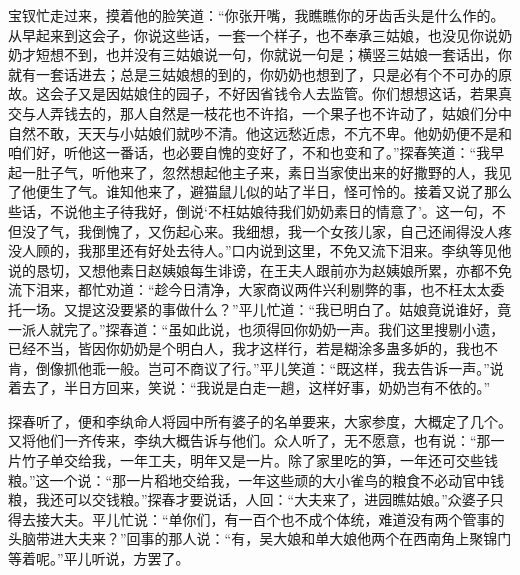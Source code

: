 宝钗忙走过来，摸着他的脸笑道：“你张开嘴，我瞧瞧你的牙齿舌头是什么作的。从早起来到这会子，你说这些话，一套一个样子，也不奉承三姑娘，也没见你说奶奶才短想不到，也并没有三姑娘说一句，你就说一句是；横竖三姑娘一套话出，你就有一套话进去；总是三姑娘想的到的，你奶奶也想到了，只是必有个不可办的原故。这会子又是因姑娘住的园子，不好因省钱令人去监管。你们想想这话，若果真交与人弄钱去的，那人自然是一枝花也不许掐，一个果子也不许动了，姑娘们分中自然不敢，天天与小姑娘们就吵不清。他这远愁近虑，不亢不卑。他奶奶便不是和咱们好，听他这一番话，也必要自愧的变好了，不和也变和了。”探春笑道：“我早起一肚子气，听他来了，忽然想起他主子来，素日当家使出来的好撒野的人，我见了他便生了气。谁知他来了，避猫鼠儿似的站了半日，怪可怜的。接着又说了那么些话，不说他主子待我好，倒说‘不枉姑娘待我们奶奶素日的情意了’。这一句，不但没了气，我倒愧了，又伤起心来。我细想，我一个女孩儿家，自己还闹得没人疼没人顾的，我那里还有好处去待人。”口内说到这里，不免又流下泪来。李纨等见他说的恳切，又想他素日赵姨娘每生诽谤，在王夫人跟前亦为赵姨娘所累，亦都不免流下泪来，都忙劝道：“趁今日清净，大家商议两件兴利剔弊的事，也不枉太太委托一场。又提这没要紧的事做什么？”平儿忙道：“我已明白了。姑娘竟说谁好，竟一派人就完了。”探春道：“虽如此说，也须得回你奶奶一声。我们这里搜剔小遗，已经不当，皆因你奶奶是个明白人，我才这样行，若是糊涂多蛊多妒的，我也不肯，倒像抓他乖一般。岂可不商议了行。”平儿笑道：“既这样，我去告诉一声。”说着去了，半日方回来，笑说：“我说是白走一趟，这样好事，奶奶岂有不依的。”

探春听了，便和李纨命人将园中所有婆子的名单要来，大家参度，大概定了几个。又将他们一齐传来，李纨大概告诉与他们。众人听了，无不愿意，也有说：“那一片竹子单交给我，一年工夫，明年又是一片。除了家里吃的笋，一年还可交些钱粮。”这一个说：“那一片稻地交给我，一年这些顽的大小雀鸟的粮食不必动官中钱粮，我还可以交钱粮。”探春才要说话，人回：“大夫来了，进园瞧姑娘。”众婆子只得去接大夫。平儿忙说：“单你们，有一百个也不成个体统，难道没有两个管事的头脑带进大夫来？”回事的那人说：“有，吴大娘和单大娘他两个在西南角上聚锦门等着呢。”平儿听说，方罢了。

